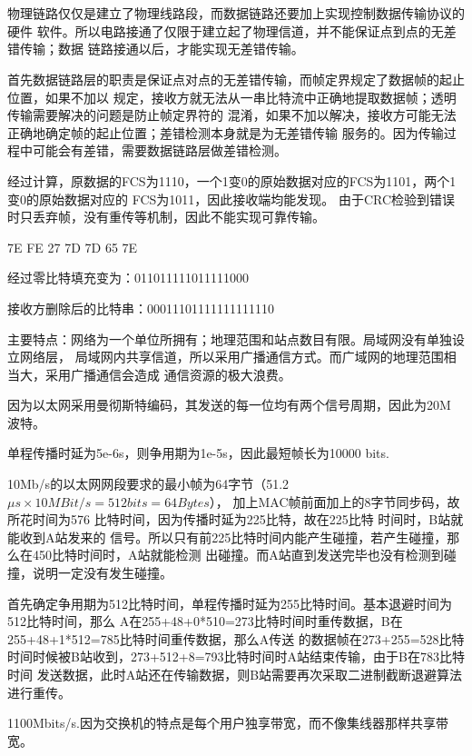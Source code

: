 \documentclass{ctexart}
\newcounter{answercnt}
\newcommand{\sCourse}{计算机网络}   %
\newcommand{\nTime}{3}             %
\newcommand{\sName}{黄昊}           %
\newcommand{\sNumber}{20204205}     %
\newcommand{\homeworkTitle}{
    \setcounter{answercnt}{0}
    \begin{center}
        \fontsize{16pt}{0}{\textbf{\kaishu\sCourse课程\quad第\nTime次作业}}\\
        \fontsize{13pt}{0}{\textit{\kaishu\sName\qquad\sNumber}}\\
    \end{center}}
\begin{document}
\homeworkTitle
\answer[3-01]
物理链路仅仅是建立了物理线路段，而数据链路还要加上实现控制数据传输协议的硬件
软件。所以电路接通了仅限于建立起了物理信道，并不能保证点到点的无差错传输；数据
链路接通以后，才能实现无差错传输。

\answer[3-04]
首先数据链路层的职责是保证点对点的无差错传输，而帧定界规定了数据帧的起止位置，如果不加以
规定，接收方就无法从一串比特流中正确地提取数据帧；透明传输需要解决的问题是防止帧定界符的
混淆，如果不加以解决，接收方可能无法正确地确定帧的起止位置；差错检测本身就是为无差错传输
服务的。因为传输过程中可能会有差错，需要数据链路层做差错检测。

\answer[3-07]
经过计算，原数据的FCS为1110，一个1变0的原始数据对应的FCS为1101，两个1变0的原始数据对应的
FCS为1011，因此接收端均能发现。
由于CRC检验到错误时只丢弃帧，没有重传等机制，因此不能实现可靠传输。

\answer[3-09]
7E FE 27 7D 7D 65 7E

\answer[3-10]
经过零比特填充变为：011011111011111000

接收方删除后的比特串：00011101111111111110

\answer[3-13]
主要特点：网络为一个单位所拥有；地理范围和站点数目有限。局域网没有单独设立网络层，
局域网内共享信道，所以采用广播通信方式。而广域网的地理范围相当大，采用广播通信会造成
通信资源的极大浪费。

\answer[3-16]
因为以太网采用曼彻斯特编码，其发送的每一位均有两个信号周期，因此为20M 波特。

\answer[3-20]
单程传播时延为5e-6s，则争用期为1e-5s，因此最短帧长为10000 bits.

\answer[3-24]
10Mb/s的以太网网段要求的最小帧为64字节（51.2$\mu s\times 10 M Bit/s=512 bits=64Bytes$），
加上MAC帧前面加上的8字节同步码，故所花时间为576 比特时间，因为传播时延为225比特，故在225比特
时间时，B站就能收到A站发来的
信号。所以只有前225比特时间内能产生碰撞，若产生碰撞，那么在450比特时间时，A站就能检测
出碰撞。而A站直到发送完毕也没有检测到碰撞，说明一定没有发生碰撞。

\answer[3-25]
首先确定争用期为512比特时间，单程传播时延为255比特时间。基本退避时间为512比特时间，那么
A在255+48+0*510=273比特时间时重传数据，B在255+48+1*512=785比特时间重传数据，那么A传送
的数据帧在273+255=528比特时间时候被B站收到，273+512+8=793比特时间时A站结束传输，由于B在783比特时间
发送数据，此时A站还在传输数据，则B站需要再次采取二进制截断退避算法进行重传。

\answer[3-30]
1100Mbits/s.因为交换机的特点是每个用户独享带宽，而不像集线器那样共享带宽。
\end{document}
